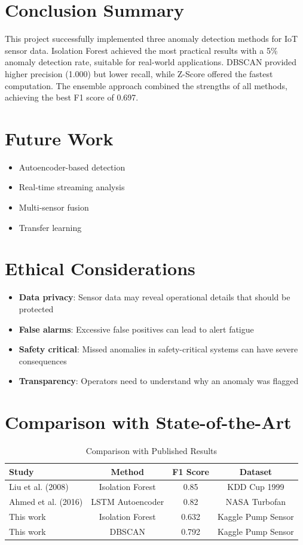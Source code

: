 \documentclass[12pt,a4paper]{report}
\begin{document}
\section{Conclusion Summary}

This project successfully implemented three anomaly detection methods for IoT sensor data. Isolation Forest achieved the most practical results with a 5\% anomaly detection rate, suitable for real-world applications. DBSCAN provided higher precision (1.000) but lower recall, while Z-Score offered the fastest computation. The ensemble approach combined the strengths of all methods, achieving the best F1 score of 0.697.

\section{Future Work}
\begin{itemize}
    \item Autoencoder-based detection
    \item Real-time streaming analysis
    \item Multi-sensor fusion
    \item Transfer learning
\end{itemize}

\section{Ethical Considerations}

\begin{itemize}
    \item \textbf{Data privacy}: Sensor data may reveal operational details that should be protected
    \item \textbf{False alarms}: Excessive false positives can lead to alert fatigue
    \item \textbf{Safety critical}: Missed anomalies in safety-critical systems can have severe consequences
    \item \textbf{Transparency}: Operators need to understand why an anomaly was flagged
\end{itemize}

\section{Comparison with State-of-the-Art}

\begin{table}[H]
\centering
\caption{Comparison with Published Results}
\begin{tabular}{lccc}
\toprule
\textbf{Study} & \textbf{Method} & \textbf{F1 Score} & \textbf{Dataset} \\
\midrule
Liu et al. (2008) & Isolation Forest & 0.85 & KDD Cup 1999 \\
Ahmed et al. (2016) & LSTM Autoencoder & 0.82 & NASA Turbofan \\
This work & Isolation Forest & 0.632 & Kaggle Pump Sensor \\
This work & DBSCAN & 0.792 & Kaggle Pump Sensor \\
\bottomrule
\end{tabular}
\end{table}
\end{document}
